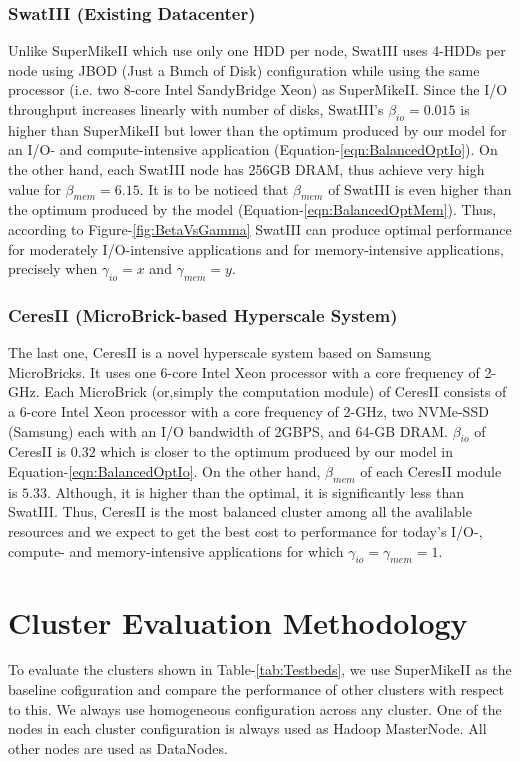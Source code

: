 \documentclass[journal]{IEEEtran}
\begin{document}
\subsubsection{SwatIII (Existing Datacenter)}
Unlike SuperMikeII which use only one HDD per node, SwatIII uses 4-HDDs per node using JBOD (Just a Bunch of Disk) conﬁguration while using the same processor (i.e. two 8-core Intel SandyBridge Xeon) as SuperMikeII. Since the I/O throughput increases linearly with number of disks, SwatIII's $\beta_{io}=0.015$ is higher than SuperMikeII but lower than the optimum produced by our model for an I/O- and compute-intensive application (Equation-\ref{eqn:BalancedOptIo}). On the other hand, each SwatIII node has 256GB DRAM, thus achieve very high value for $\beta_{mem}=6.15$. It is to be noticed that $\beta_{mem}$ of SwatIII is even higher than the optimum produced by the model (Equation-\ref{eqn:BalancedOptMem}). Thus, according to Figure-\ref{fig:BetaVsGamma} SwatIII can produce optimal performance for moderately I/O-intensive applications and for memory-intensive applications, precisely when $\gamma_{io} = x$ and $\gamma_{mem}=y$.
\subsubsection{CeresII (MicroBrick-based Hyperscale System)}
The last one, CeresII is a novel hyperscale system based on Samsung MicroBricks. It uses one 6-core Intel Xeon processor with a core frequency of 2-GHz. Each MicroBrick (or,simply the computation module) of CeresII consists of a 6-core Intel Xeon processor with a core frequency of 2-GHz, two NVMe-SSD (Samsung) each with an I/O bandwidth of 2GBPS, and 64-GB DRAM. $\beta
_{io}$ of CeresII is $0.32$ which is closer to the optimum produced by our model in Equation-\ref{eqn:BalancedOptIo}.  On the other hand, $\beta_{mem}$ of each CeresII module is $5.33$. Although, it is higher than the optimal, it is significantly less than SwatIII. Thus, CeresII is the most balanced cluster among all the avalilable resources and we expect to get the best cost to performance for today's I/O-, compute- and memory-intensive applications for which  $\gamma_{io} = \gamma_{mem} = 1$. 

\section{Cluster Evaluation Methodology}
To evaluate the clusters shown in Table-\ref{tab:Testbeds}, we use SuperMikeII as the baseline cofiguration and compare the performance of other clusters with respect to this. We always use homogeneous conﬁguration across any cluster. One of the nodes in each cluster configuration is always used as Hadoop MasterNode. All other nodes are used as DataNodes.
\end{document}
